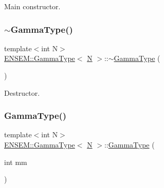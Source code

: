 Main constructor. 

\mbox{\label{classENSEM_1_1GammaType_a2cc80e9a9f044b1b9b344f3419718a5e}} 
\subsubsection{\texorpdfstring{$\sim$GammaType()}{~GammaType()}\hspace{0.1cm}{\footnotesize\ttfamily [1/2]}}
{\footnotesize\ttfamily template$<$int N$>$ \\
\mbox{\hyperlink{classENSEM_1_1GammaType}{E\+N\+S\+E\+M\+::\+Gamma\+Type}}$<$ \mbox{\hyperlink{operator__name__util_8cc_a7722c8ecbb62d99aee7ce68b1752f337}{N}} $>$\+::$\sim$\mbox{\hyperlink{classENSEM_1_1GammaType}{Gamma\+Type}} (\begin{DoxyParamCaption}{ }\end{DoxyParamCaption})\hspace{0.3cm}{\ttfamily [inline]}}



Destructor. 

\mbox{\label{classENSEM_1_1GammaType_ab93a83aeee6b442968d78f30cb6b4a65}} 
\subsubsection{\texorpdfstring{GammaType()}{GammaType()}\hspace{0.1cm}{\footnotesize\ttfamily [2/4]}}
{\footnotesize\ttfamily template$<$int N$>$ \\
\mbox{\hyperlink{classENSEM_1_1GammaType}{E\+N\+S\+E\+M\+::\+Gamma\+Type}}$<$ \mbox{\hyperlink{operator__name__util_8cc_a7722c8ecbb62d99aee7ce68b1752f337}{N}} $>$\+::\mbox{\hyperlink{classENSEM_1_1GammaType}{Gamma\+Type}} (\begin{DoxyParamCaption}\item[{int}]{mm }\end{DoxyParamCaption})\hspace{0.3cm}{\ttfamily [inline]}}



